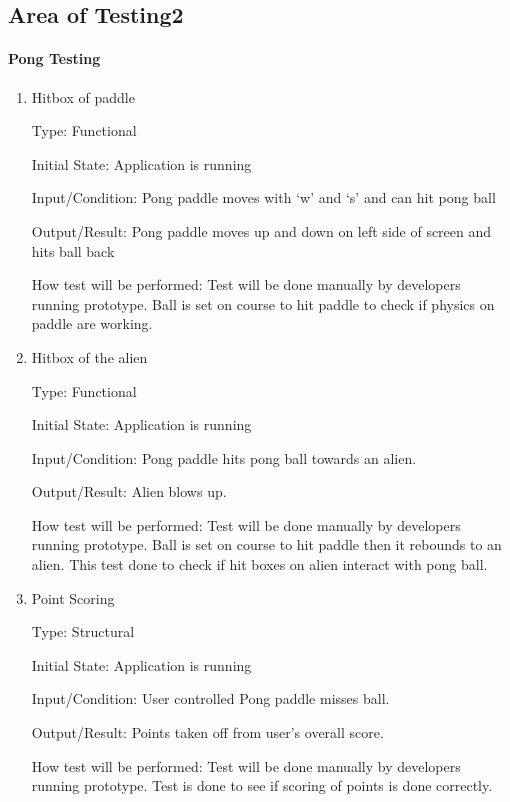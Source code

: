 \documentclass[12pt, titlepage]{article}
\begin{document}
\subsection{Area of Testing2}

\paragraph{Pong Testing}

\begin{enumerate}

\item{Hitbox of paddle\\}

Type: Functional

Initial State: Application is running

Input/Condition: Pong paddle moves with ‘w’ and ‘s’ and can hit pong ball

Output/Result: Pong paddle moves up and down on left side of screen and hits ball back

How test will be performed: Test will be done manually by developers running prototype. Ball is set on course to hit paddle to check if physics on paddle are working.


\item{Hitbox of the alien\\}

Type: Functional

Initial State: Application is running

Input/Condition: Pong paddle hits pong ball towards an alien.

Output/Result: Alien blows up.

How test will be performed: Test will be done manually by developers running prototype. Ball is set on course to hit paddle then it rebounds to an alien. This test done to check if hit boxes on alien interact with pong ball.


\item{Point Scoring\\}

Type: Structural

Initial State: Application is running

Input/Condition: User controlled Pong paddle misses ball. 

Output/Result: Points taken off from user’s overall score.

How test will be performed: Test will be done manually by developers running prototype. Test is done to see if scoring of points is done correctly.

\end{enumerate}
	
\end{document}
